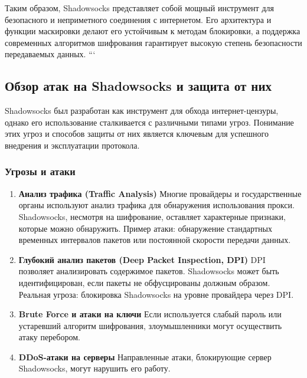 \documentclass{SCWorks}
\begin{document}
Таким образом, Shadowsocks представляет собой мощный инструмент для безопасного и неприметного соединения с интернетом. Его архитектура и функции маскировки делают его устойчивым к методам блокировки, а поддержка современных алгоритмов шифрования гарантирует высокую степень безопасности передаваемых данных.
```

\subsection{Обзор атак на Shadowsocks и защита от них}

Shadowsocks был разработан как инструмент для обхода интернет-цензуры, однако его использование сталкивается с различными типами угроз. Понимание этих угроз и способов защиты от них является ключевым для успешного внедрения и эксплуатации протокола.

\subsubsection{Угрозы и атаки}
\begin{enumerate}
    \item \textbf{Анализ трафика (Traffic Analysis)}  
    Многие провайдеры и государственные органы используют анализ трафика для обнаружения использования прокси. Shadowsocks, несмотря на шифрование, оставляет характерные признаки, которые можно обнаружить. Пример атаки: обнаружение стандартных временных интервалов пакетов или постоянной скорости передачи данных.

    \item \textbf{Глубокий анализ пакетов (Deep Packet Inspection, DPI)}  
    DPI позволяет анализировать содержимое пакетов. Shadowsocks может быть идентифицирован, если пакеты не обфусцированы должным образом. Реальная угроза: блокировка Shadowsocks на уровне провайдера через DPI.

    \item \textbf{Brute Force и атаки на ключи}  
    Если используется слабый пароль или устаревший алгоритм шифрования, злоумышленники могут осуществить атаку перебором.

    \item \textbf{DDoS-атаки на серверы}  
    Направленные атаки, блокирующие сервер Shadowsocks, могут нарушить его работу.
\end{enumerate}
\end{document}
